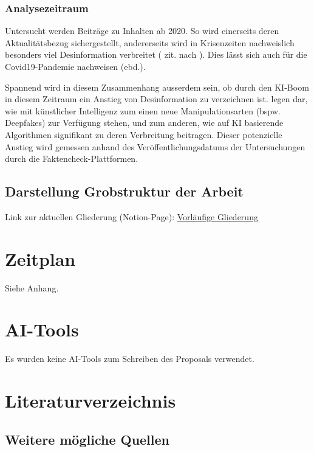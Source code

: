 \documentclass[12pt,a4paper]{article}        %
\begin{document}
\subsubsection{Analysezeitraum}
Untersucht werden Beiträge zu Inhalten ab 2020. So wird einerseits deren Aktualitätsbezug sichergestellt, andererseits wird in Krisenzeiten nachweislich besonders viel Desinformation verbreitet (\textcite{tandoc_defining_2018} zit. nach \textcite[2]{ceron_fake_2021}). Dies lässt sich auch für die Covid19-Pandemie nachweisen (ebd.).

Spannend wird in diesem Zusammenhang ausserdem sein, ob durch den KI-Boom in diesem Zeitraum ein Anstieg von Desinformation zu verzeichnen ist. \textcite[e32-3]{bontridder_role_2021} legen dar, wie mit künstlicher Intelligenz zum einen neue Manipulationsarten (bspw. Deepfakes) zur Verfügung stehen, und zum anderen, wie auf KI basierende Algorithmen signifikant zu deren Verbreitung beitragen.
Dieser potenzielle Anstieg wird gemessen anhand des Veröffentlichungsdatums der Untersuchungen durch die Faktencheck-Plattformen.


\subsection{Darstellung Grobstruktur der Arbeit}
Link zur aktuellen Gliederung (Notion-Page): \href{https://yannix.notion.site/Vorl-ufige-Gliederung-132c91f07039801fb0e0ed859201268b}{Vorläufige Gliederung}

\section{Zeitplan}
Siehe Anhang.

\section{AI-Tools}
Es wurden keine AI-Tools zum Schreiben des Proposals verwendet.

\pagebreak
\section{Literaturverzeichnis}

\subsection{Weitere mögliche Quellen}
\end{document}

